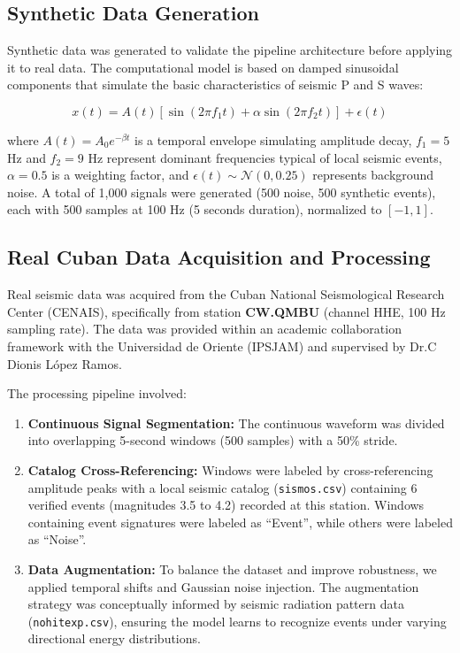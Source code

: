\documentclass[10pt,a4paper]{article}
\begin{document}
\subsection{Synthetic Data Generation}

Synthetic data was generated to validate the pipeline architecture before applying it to real data. The computational model is based on damped sinusoidal components that simulate the basic characteristics of seismic P and S waves:

\begin{equation}
x(t) = A(t) \left[ \sin(2\pi f_1 t) + \alpha \sin(2\pi f_2 t) \right] + \epsilon(t)
\end{equation}

where $A(t) = A_0 e^{-\beta t}$ is a temporal envelope simulating amplitude decay, $f_1 = 5$ Hz and $f_2 = 9$ Hz represent dominant frequencies typical of local seismic events, $\alpha = 0.5$ is a weighting factor, and $\epsilon(t) \sim \mathcal{N}(0, 0.25)$ represents background noise. A total of 1,000 signals were generated (500 noise, 500 synthetic events), each with 500 samples at 100 Hz (5 seconds duration), normalized to $[-1, 1]$.

\subsection{Real Cuban Data Acquisition and Processing}

Real seismic data was acquired from the Cuban National Seismological Research Center (CENAIS), specifically from station \textbf{CW.QMBU} (channel HHE, 100 Hz sampling rate). The data was provided within an academic collaboration framework with the Universidad de Oriente (IPSJAM) and supervised by Dr.C Dionis López Ramos.

The processing pipeline involved:
\begin{enumerate}
\item \textbf{Continuous Signal Segmentation:} The continuous waveform was divided into overlapping 5-second windows (500 samples) with a 50\% stride.
\item \textbf{Catalog Cross-Referencing:} Windows were labeled by cross-referencing amplitude peaks with a local seismic catalog (\texttt{sismos.csv}) containing 6 verified events (magnitudes 3.5 to 4.2) recorded at this station. Windows containing event signatures were labeled as ``Event'', while others were labeled as ``Noise''.
\item \textbf{Data Augmentation:} To balance the dataset and improve robustness, we applied temporal shifts and Gaussian noise injection. The augmentation strategy was conceptually informed by seismic radiation pattern data (\texttt{nohitexp.csv}), ensuring the model learns to recognize events under varying directional energy distributions.
\end{enumerate}
\end{document}
